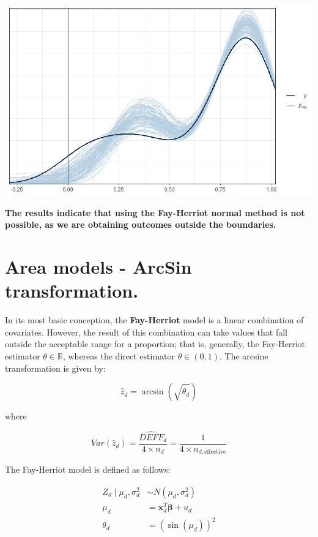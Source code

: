 \documentclass[
  12pt,
]{book}
\begin{document}
\includegraphics{Recursos/03_FH_normal/04_ppc_normal.png}

{\textbf{The results indicate that using the Fay-Herriot normal method is not possible, as we are obtaining outcomes outside the boundaries.}}

\hypertarget{area-models---arcsin-transformation.}{%
\section{Area models - ArcSin transformation.}\label{area-models---arcsin-transformation.}}

In its most basic conception, the \textbf{Fay-Herriot} model is a linear combination of covariates. However, the result of this combination can take values that fall outside the acceptable range for a proportion; that is, generally, the Fay-Herriot estimator \(\theta \in \mathbb{R}\), whereas the direct estimator \(\theta \in (0,1)\). The arcsine transformation is given by:

\[
\hat{z}_d = \arcsin\left( \sqrt{ \hat{\theta}_d} \right)
\]

where

\[
Var\left( \hat{z}_d \right) = \frac{\widehat{DEFF}_d}{4\times n_d} = \frac{1}{4\times n_{d, \text{effective}} }
\]

The Fay-Herriot model is defined as follows:

\begin{align*}
Z_d \mid \mu_d,\sigma^2_d &  \sim  N(\mu_d, \sigma^2_d)\\
\mu_d & = \boldsymbol{x}^{T}_{d}\boldsymbol{\beta} + u_d \\
\theta_d & =  \left(\sin(\mu_d)\right)^2
\end{align*}
\end{document}
